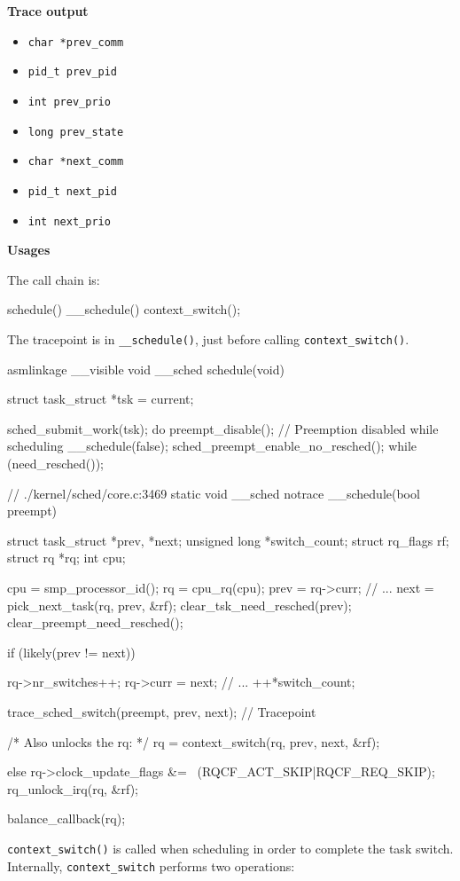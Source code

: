 \textbf{Trace output}
\begin{itemize}
    \item \verb|char *prev_comm|
    \item \verb|pid_t prev_pid|
    \item \verb|int prev_prio|
    \item \verb|long prev_state|
    \item \verb|char *next_comm|
    \item \verb|pid_t next_pid|
    \item \verb|int next_prio|
\end{itemize}

\textbf{Usages}

The call chain is:
\begin{code}
schedule(){
    __schedule(){
        context_switch();
    }
}
\end{code}
The tracepoint is in \verb|__schedule()|, just before calling \verb|context_switch()|.
\begin{code}
asmlinkage __visible void __sched schedule(void) {
	struct task_struct *tsk = current;

	sched_submit_work(tsk);
	do {
		preempt_disable(); // Preemption disabled while scheduling
		__schedule(false);
		sched_preempt_enable_no_resched();
	} while (need_resched());
}
\end{code}
\begin{code}
// ./kernel/sched/core.c:3469
static void __sched notrace __schedule(bool preempt) {
	struct task_struct *prev, *next;
	unsigned long *switch_count;
	struct rq_flags rf;
	struct rq *rq;
	int cpu;

	cpu = smp_processor_id();
	rq = cpu_rq(cpu);
	prev = rq->curr;
        // ...
	next = pick_next_task(rq, prev, &rf);
	clear_tsk_need_resched(prev);
	clear_preempt_need_resched();

	if (likely(prev != next)) {
		rq->nr_switches++;
		rq->curr = next;
                // ...
		++*switch_count;

		trace_sched_switch(preempt, prev, next); // Tracepoint

		/* Also unlocks the rq: */
		rq = context_switch(rq, prev, next, &rf);
	} else {
		rq->clock_update_flags &= ~(RQCF_ACT_SKIP|RQCF_REQ_SKIP);
		rq_unlock_irq(rq, &rf);
	}

	balance_callback(rq);
}
\end{code}
\verb|context_switch()| is called when scheduling in order to complete the task switch. 
Internally, \verb|context_switch| performs two operations:
